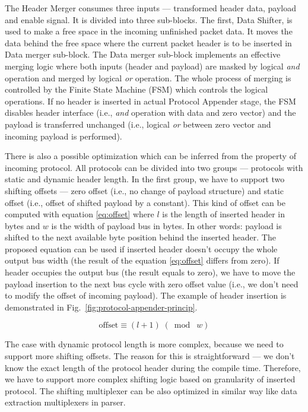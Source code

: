 The Header Merger consumes three inputs --- transformed header data, payload and enable signal. 
It is divided into three
sub-blocks. The first, Data Shifter, is used to make a free space in the incoming unfinished packet data.
It moves the data behind the free space where the current packet header is to be inserted
in Data merger sub-block. The Data merger sub-block implements an effective merging logic where both inputs (header and payload) 
are masked by logical \textit{and} operation and merged by logical \textit{or} operation. 
The whole process of merging is controlled by the Finite State Machine (FSM) which controls the logical operations. If no header is 
inserted in actual Protocol Appender stage, the FSM disables header interface (i.e., \textit{and} operation with data and zero vector) and
the payload is transferred unchanged (i.e., logical \textit{or} between zero vector and incoming payload is performed).
 
There is also a possible optimization which can be inferred from the property of incoming protocol. All protocols can be
divided into two groups --- protocols with static and dynamic header length. In the first group, we have to support two shifting
offsets --- zero offset (i.e., no change of payload structure) and static offset (i.e., offset of shifted payload by a constant). 
This kind of offset can be computed with equation \ref{eq:offset} where $l$ is the length of inserted header in bytes and $w$ 
is the width of payload bus in bytes. In other words: payload is shifted to the next available byte position behind the inserted header. 
The proposed equation can be used if inserted header doesn't occupy the whole output bus width 
(the result of the equation \ref{eq:offset} differs from zero). 
If header occupies the output bus (the result equals to zero), 
we have to move the payload insertion to the next bus cycle with zero offset value 
(i.e., we don't need to modify the offset of incoming payload).
The example of header insertion is demonstrated in Fig.~\ref{fig:protocol-appender-princip}.

\begin{equation}
\textrm{offset} \equiv (l+1) \;(\bmod\; w)
\label{eq:offset}
\end{equation}

The case with dynamic protocol length is more complex, because we need to support more shifting offsets. The reason
for this is straightforward --- we don't know the exact length of the protocol header during the compile time. 
Therefore, we have to support more complex shifting logic based on granularity of inserted protocol.
The shifting multiplexer can be also optimized in similar way like data extraction multiplexers in parser.

